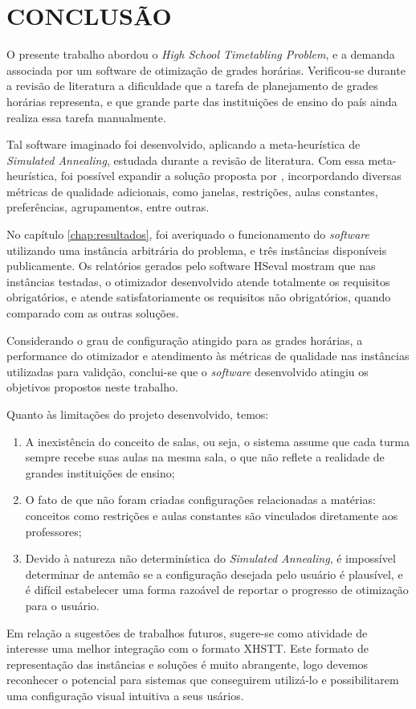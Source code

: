 
\chapter{CONCLUSÃO}
\label{chap:conclusao}

O presente trabalho abordou o \textit{High School Timetabling Problem}, e a demanda associada por um software de otimização de grades horárias. Verificou-se durante a revisão de literatura a dificuldade que a tarefa de planejamento de grades horárias representa, e que grande parte das instituições de ensino do país ainda realiza essa tarefa manualmente.

Tal software imaginado foi desenvolvido, aplicando a meta-heurística de \textit{Simulated Annealing}, estudada durante a revisão de literatura. Com essa meta-heurística, foi possível expandir a solução proposta por , incorpordando diversas métricas de qualidade adicionais, como janelas, restrições, aulas constantes, preferências, agrupamentos, entre outras.

No capítulo \ref{chap:resultados}, foi averiquado o funcionamento do \textit{software} utilizando uma instância arbitrária do problema, e três instâncias disponíveis publicamente. Os relatórios gerados pelo software HSeval mostram que nas instâncias testadas, o otimizador desenvolvido atende totalmente os requisitos obrigatórios, e atende satisfatoriamente os requisitos não obrigatórios, quando comparado com as outras soluções.

Considerando o grau de configuração atingido para as grades horárias, a performance do otimizador e atendimento às métricas de qualidade nas instâncias utilizadas para validção, conclui-se que o \textit{software} desenvolvido atingiu os objetivos propostos neste trabalho.

Quanto às limitações do projeto desenvolvido, temos:
\begin{enumerate}
	\item A inexistência do conceito de salas, ou seja, o sistema assume que cada turma sempre recebe suas aulas na mesma sala, o que não reflete a realidade de grandes instituições de ensino;
	\item O fato de que não foram criadas configurações relacionadas a matérias: conceitos como restrições e aulas constantes são vinculados diretamente aos professores;
	\item Devido à natureza não determinística do \textit{Simulated Annealing}, é impossível determinar de antemão se a configuração desejada pelo usuário é plausível, e é difícil estabelecer uma forma razoável de reportar o progresso de otimização para o usuário.
\end{enumerate}

Em relação a sugestões de trabalhos futuros, sugere-se como atividade de interesse uma melhor integração com o formato XHSTT. Este formato de representação das instâncias e soluções é muito abrangente, logo devemos reconhecer o potencial para sistemas que conseguirem utilizá-lo e possibilitarem uma configuração visual intuitiva a seus usários.
